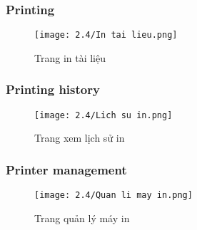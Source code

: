 \subsubsection{Printing}
\begin{figure}[H]
    \centering
    \texttt{[image: 2.4/In tai lieu.png]}
    \newline
    \newline
    \caption{Trang in tài liệu}
    \label{fig:enter-label}
\end{figure}

\subsubsection{Printing history}
\begin{figure}[H]
    \centering
    \texttt{[image: 2.4/Lich su in.png]}
    \newline
    \newline
    \caption{Trang xem lịch sử in}
    \label{fig:enter-label}
\end{figure}

\subsubsection{Printer management}
\begin{figure}[H]
    \centering
    \texttt{[image: 2.4/Quan li may in.png]}
    \newline
    \newline
    \caption{Trang quản lý máy in}
    \label{fig:enter-label}
\end{figure}

